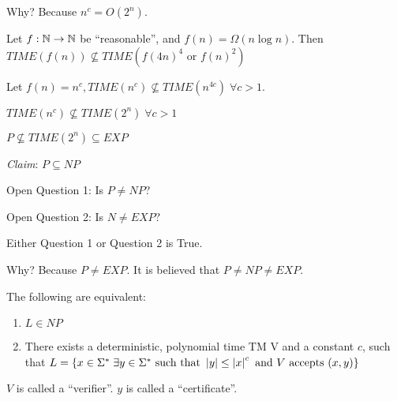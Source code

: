Why? Because $n^c = O(2^n)$.

\begin{theorem}
    Let $f:\mathbb{N} \rightarrow \mathbb{N}$ be ``reasonable'', and $f(n) = \Omega(n \log{n})$. Then $TIME(f(n)) \not\subseteq TIME(f(4n)^4 \text{ or } f(n)^2)$
\end{theorem}

\begin{example}
    Let $f(n) = n^c, TIME(n^c) \not\subseteq TIME(n^{4c}) \; \forall c > 1$.
\end{example}

\begin{corollary}
    $TIME(n^c) \not\subseteq TIME(2^n) \;\forall c > 1$
\end{corollary}

\begin{corollary}
    $P \not\subseteq TIME(2^n) \subseteq EXP$
\end{corollary}

\emph{Claim}: $P \subseteq NP$

Open Question 1: Is $P \neq NP$?

Open Question 2: Is $N \neq EXP$?


\begin{theorem}
    Either Question 1 or Question 2 is True.
\end{theorem}

Why? Because $P \neq EXP$. It is believed that $P \neq NP \neq EXP$.

\begin{theorem}[Sipser 7.20]
    The following are equivalent:

    \begin{enumerate}
      \item $L \in NP$
      \item There exists a deterministic, polynomial time TM V and a constant $c$, such that $L = \left \{ x \in \Sigma^* \; \exists y \in \Sigma^* \text{ such that } \left | y \right | \leq \left | x \right |^c \text{ and } V \text{ accepts } (x, y) \right \}$
    \end{enumerate}
\end{theorem}

$V$ is called a ``verifier''. $y$ is called a ``certificate''.
